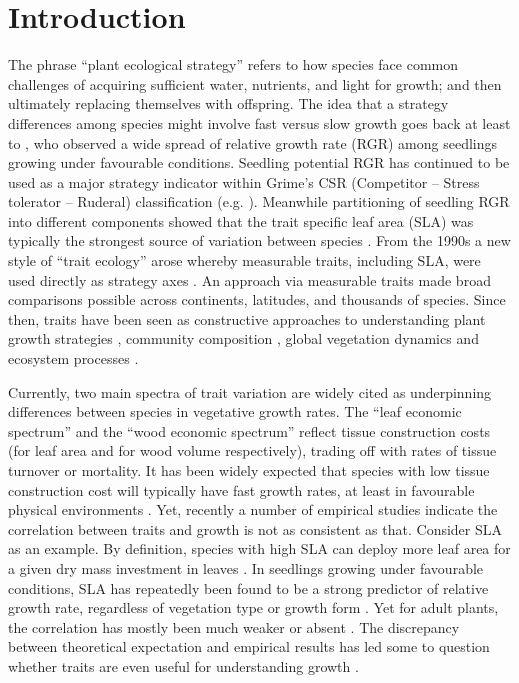 \documentclass[a4paper,11pt]{article}
\begin{document}
\clearpage

\section*{Introduction}\label{introduction}

The phrase ``plant ecological strategy'' refers to how species face common challenges of acquiring sufficient water, nutrients, and light for growth; and then ultimately replacing themselves with offspring. The idea that a strategy differences among species might involve fast versus slow growth goes back at least to \citet{Grime:1975gr}, who observed a wide spread of relative growth rate (RGR) among seedlings growing under favourable conditions. Seedling potential RGR has continued to be used as a major strategy indicator within Grime's CSR (Competitor -- Stress tolerator -- Ruderal) classification (e.g. \citealt{grime1979plant, Grime:1997wm}). Meanwhile partitioning of seedling RGR into different components showed that the trait specific leaf area (SLA) was typically the strongest source of variation between species \citep{Poorter:1989tx, Rees:2010gk}. From the 1990s a new style of ``trait ecology'' arose whereby measurable traits, including SLA, were used directly as strategy axes \citep{Westoby:2002ft}. An approach via measurable traits made broad comparisons possible across continents, latitudes, and thousands of species. Since then, traits have been seen as constructive approaches to understanding plant growth strategies \citep{Westoby:2002ft}, community composition \citep{Lavorel:2002ff,Shipley:2006ie}, global vegetation dynamics \citep{Scheiter:2013ed} and ecosystem processes \citep{Lavorel:2002ff}.

Currently, two main spectra of trait variation are widely cited as underpinning differences between species in vegetative growth rates. The ``leaf economic spectrum'' \citep{Wright:2004jb} and the ``wood economic spectrum'' \citep{Chave:2009iy} reflect tissue construction costs (for leaf area and for wood volume respectively), trading off with rates of tissue turnover or mortality. It has been widely expected that species with low tissue construction cost will typically have fast growth rates, at least in favourable physical environments \citep[e.g.][]{MullerLandau:2004dc,Poorter:2008iu,Chave:2009iy,Larjavaara:2010bn,Iida:2012jb,Paine:2015df}. Yet, recently a number of empirical studies indicate the correlation between traits and growth is not as consistent as that. Consider SLA as an example. By definition, species with high SLA can deploy more leaf area for a given dry mass investment in leaves \citep{Poorter:1999wd, Reich:1992wm}. In seedlings growing under favourable conditions, SLA has repeatedly been found to be a strong predictor of relative growth rate, regardless of vegetation type or growth form \citep{Lambers:1992bj,Reich:1992wm,Grime:1997wm,Poorter:1999wd,Wright:1999ds}. Yet for adult plants, the correlation has mostly been much weaker or absent \citep{coomes_comparison_1998,Poorter:2008iu,Aiba:2009ft,Easdale:2009gv,Wright:2010tp}. The discrepancy between theoretical expectation and empirical results has led some to question whether traits are even useful for understanding growth \citep{Wright:2010tp, Paine:2015df}.
\end{document}
